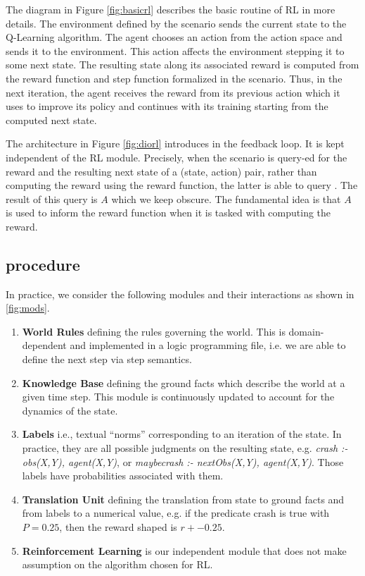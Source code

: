 The diagram in Figure \ref{fig:basicrl} describes the basic routine of RL in more details. The environment defined by the scenario sends the current state 
to the Q-Learning algorithm. The agent chooses an action from the action space and sends it to the environment. This action affects the environment stepping it to some next state. 
The resulting state along its associated reward is computed from the reward function and step function formalized in the scenario. Thus, in the next iteration, the 
agent receives the reward from its previous action which it uses to improve its policy and continues with its training starting from the computed next state.  

\medskip 

The architecture in Figure \ref{fig:diorl} introduces \dio in the feedback loop. It is kept independent of the RL module. Precisely, when the scenario is query-ed for the reward and 
the resulting next state of a (state, action) pair, rather than computing the reward using the reward function, the latter is able to query \dio. The result of this query is $A$ which we keep 
obscure. The fundamental idea is that $A$ is used to inform the reward function when it is tasked with computing the reward. 
 

\subsection{\dio procedure}
\label{sec:modules}
In practice, we consider the following modules and their interactions as shown in \ref{fig:mods}.

\begin{enumerate}
  \item \textbf{World Rules} defining the rules governing the world. This is domain-dependent and implemented 
        in a logic programming file, i.e. we are able to define the next step via step semantics.
  \item \textbf{Knowledge Base} defining the ground facts which describe the world at a given time step. This module is 
        continuously updated to account for the dynamics of the
        state.
  \item \textbf{Labels} i.e., textual ``norms'' corresponding to an
  iteration of the state. In practice, they are all possible judgments on the resulting state, e.g. \textit{crash :- obs(X,Y), agent(X,Y)}, 
                  or \textit{maybecrash :- nextObs(X,Y), agent(X,Y)}. 
                    Those labels have probabilities associated with
                    them.
  \item \textbf{Translation Unit} defining the translation from state to ground facts and from labels to a numerical value, e.g. if the predicate crash is true with $P = 0.25$, then the reward shaped is $r + -0.25$. 
  \item \textbf{Reinforcement Learning} is our independent module that does not make assumption on the algorithm chosen for RL.
\end{enumerate}


